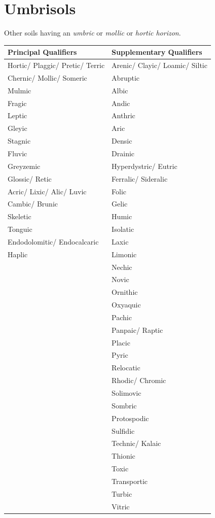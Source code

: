 \documentclass[
  letterpaper,
  DIV=11,
  numbers=noendperiod]{scrreprt}
\begin{document}

\hypertarget{key-umbrisols}{%
\chapter{Umbrisols}\label{key-umbrisols}}

Other soils having an \emph{umbric} or \emph{mollic} or \emph{hortic
horizon}.

\begin{longtable}[]{@{}ll@{}}
\toprule()
Principal Qualifiers & Supplementary Qualifiers \\
\midrule()
\endhead
Hortic/ Plaggic/ Pretic/ Terric & Arenic/ Clayic/ Loamic/ Siltic \\
Chernic/ Mollic/ Someric & Abruptic \\
Mulmic & Albic \\
Fragic & Andic \\
Leptic & Anthric \\
Gleyic & Aric \\
Stagnic & Densic \\
Fluvic & Drainic \\
Greyzemic & Hyperdystric/ Eutric \\
Glossic/ Retic & Ferralic/ Sideralic \\
Acric/ Lixic/ Alic/ Luvic & Folic \\
Cambic/ Brunic & Gelic \\
Skeletic & Humic \\
Tonguic & Isolatic \\
Endodolomitic/ Endocalcaric & Laxic \\
Haplic & Limonic \\
& Nechic \\
& Novic \\
& Ornithic \\
& Oxyaquic \\
& Pachic \\
& Panpaic/ Raptic \\
& Placic \\
& Pyric \\
& Relocatic \\
& Rhodic/ Chromic \\
& Solimovic \\
& Sombric \\
& Protospodic \\
& Sulfidic \\
& Technic/ Kalaic \\
& Thionic \\
& Toxic \\
& Transportic \\
& Turbic \\
& Vitric \\
\bottomrule()
\end{longtable}
\end{document}
